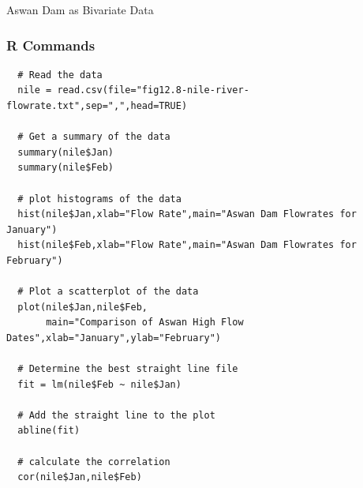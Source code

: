 \begin{frame}{Aswan Dam as Bivariate Data}


  
\end{frame}

\begin{frame}[fragile]
  \frametitle{R Commands}

{\tiny
\begin{verbatim}
  # Read the data
  nile = read.csv(file="fig12.8-nile-river-flowrate.txt",sep=",",head=TRUE)

  # Get a summary of the data
  summary(nile$Jan)
  summary(nile$Feb)

  # plot histograms of the data
  hist(nile$Jan,xlab="Flow Rate",main="Aswan Dam Flowrates for January")
  hist(nile$Feb,xlab="Flow Rate",main="Aswan Dam Flowrates for February")

  # Plot a scatterplot of the data
  plot(nile$Jan,nile$Feb,
       main="Comparison of Aswan High Flow Dates",xlab="January",ylab="February")

  # Determine the best straight line file
  fit = lm(nile$Feb ~ nile$Jan)

  # Add the straight line to the plot
  abline(fit)

  # calculate the correlation
  cor(nile$Jan,nile$Feb)
\end{verbatim}
  }
\end{frame}

